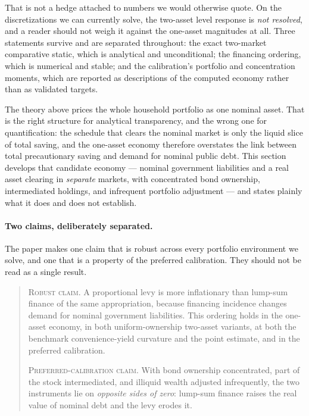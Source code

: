 \documentclass[12pt]{article}
\begin{document}
That is not a hedge attached to numbers we would otherwise quote. On the discretizations we can
currently solve, the two-asset level response is \emph{not resolved}, and a reader should not weigh
it against the one-asset magnitudes at all. Three statements survive and are separated throughout:
the exact two-market comparative static, which is analytical and unconditional; the financing
ordering, which is numerical and stable; and the calibration's portfolio and concentration moments,
which are reported as descriptions of the computed economy rather than as validated targets.

The theory above prices the whole household portfolio as one nominal asset.
That is the right structure for analytical transparency, and the wrong one
for quantification: the schedule that clears the nominal market is only the
liquid slice of total saving, and the one-asset economy therefore overstates
the link between total precautionary saving and demand for nominal public
debt. This section develops that candidate economy --- nominal government
liabilities and a real asset clearing in
\emph{separate} markets, with concentrated bond ownership, intermediated
holdings, and infrequent portfolio adjustment --- and states plainly what it
does and does not establish.

\paragraph{Two claims, deliberately separated.} The paper makes one claim
that is robust across every portfolio environment we solve, and one that is
a property of the preferred calibration. They should not be read as a
single result.

\begin{quote}
\textsc{Robust claim.} A proportional levy is more inflationary than
lump-sum finance of the same appropriation, because financing incidence
changes demand for nominal government liabilities. This ordering holds in
the one-asset economy, in both uniform-ownership two-asset variants, at
both the benchmark convenience-yield curvature and the \citeauthor{krishnamurthy2012}
point estimate, and in the
preferred calibration.

\smallskip
\textsc{Preferred-calibration claim.} With bond ownership concentrated,
part of the stock intermediated, and illiquid wealth adjusted infrequently,
the two instruments lie on \emph{opposite sides of zero}: lump-sum finance
raises the real value of nominal debt and the levy erodes it.
\end{quote}
\end{document}
